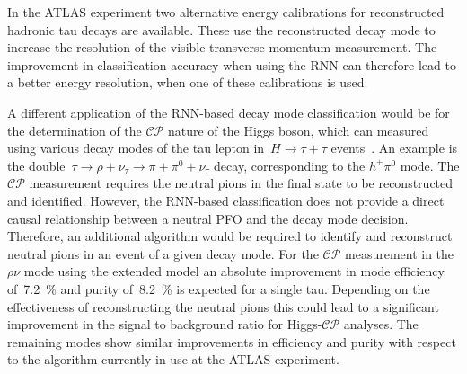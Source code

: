 In the ATLAS experiment two alternative energy calibrations for reconstructed
hadronic tau decays are available. These use the reconstructed decay mode to
increase the resolution of the visible transverse momentum measurement. The
improvement in classification accuracy when using the RNN can therefore lead to
a better energy resolution, when one of these calibrations is used.

A different application of the RNN-based decay mode classification would be for
the determination of the $\mathcal{CP}$ nature of the Higgs boson, which can
measured using various decay modes of the tau lepton in~$H \to \tau + \tau$
events~\cite{Berge2014}. An example is the
double~$\tau \to \rho + \nu_\tau \to \pi + \pi^0 + \nu_\tau$ decay,
corresponding to the $h^\pm \pi^0$ mode. The $\mathcal{CP}$ measurement requires
the neutral pions in the final state to be reconstructed and identified.
However, the RNN-based classification does not provide a direct causal
relationship between a neutral PFO and the decay mode decision. Therefore, an
additional algorithm would be required to identify and reconstruct neutral pions
in an event of a given decay mode. For the $\mathcal{CP}$ measurement in the
$\rho\nu$ mode using the extended model an absolute improvement in mode
efficiency of~\SI{7.2}{\percent} and purity of~\SI{8.2}{\percent} is expected
for a single tau. Depending on the effectiveness of reconstructing the neutral
pions this could lead to a significant improvement in the signal to background
ratio for Higgs-$\mathcal{CP}$ analyses. The remaining modes show similar
improvements in efficiency and purity with respect to the algorithm currently in
use at the ATLAS experiment.

